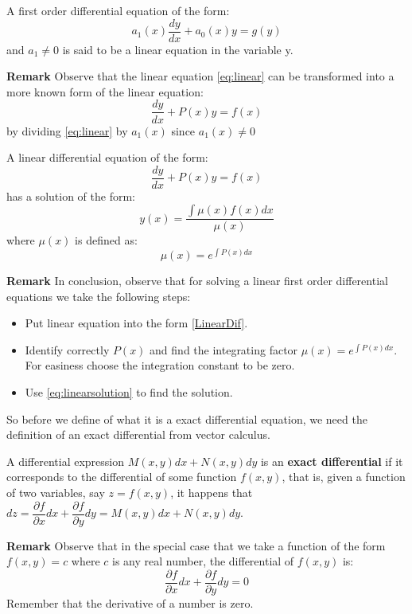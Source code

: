 \begin{define}
A first order differential equation of the form:
\begin{equation} \label{eq:linear}
a_1(x)\dfrac{dy}{dx} + a_0(x)y = g(y)
\end{equation}
and $a_1 \neq 0$ is said to be a linear equation in the variable y.
\end{define}
\textbf{Remark} Observe that the linear equation \eqref{eq:linear}
can be transformed into a more known form of the linear equation:
\begin{equation} \label{LinearDif}
\dfrac{dy}{dx} + P(x)y 	= f(x)
\end{equation}
by dividing \eqref{eq:linear} by $a_1(x)$ since $a_1(x) \neq 0$
\begin{thm}
A linear differential equation of the form:
\begin{equation*}
\dfrac{dy}{dx} + P(x)y 	= f(x)
\end{equation*}
has a solution of the form:
\begin{equation} \label{eq:linearsolution}
y(x) = \dfrac{\int \mu(x)f(x)dx}{ \mu(x)}
\end{equation}
where $\mu(x)$ is defined as:
\begin{equation*}
\mu(x) = e^{ \int P(x) dx}
\end{equation*}
\end{thm}
\textbf{Remark} In conclusion, observe that for solving a linear first order differential equations we take the following steps:
\begin{itemize}
\item Put linear equation into the form \eqref{LinearDif}.
\item Identify correctly $P(x)$ and find the integrating factor $ \mu(x) = e^{ \int P(x) dx}$. For easiness choose the integration constant to be zero.
\item Use \eqref{eq:linearsolution} to find the solution.
\end{itemize} 
So before we define of what it is a exact differential equation, we need the definition of an exact differential from vector calculus.
\begin{define}
A differential expression $ M(x,y)dx + N(x,y)dy $ is an \textbf{exact differential} if it corresponds to the differential of some function $f(x,y)$, that is, given a function of two variables, say $ z = f(x,y) $, it happens that $ dz =  \dfrac{\partial f}{\partial x}dx + \dfrac{\partial f}{\partial y}dy = M(x,y)dx + N(x,y)dy $.
\end{define}
\textbf{Remark}
Observe that in the special case that we take a function of the form $ f(x,y) = c $ where $c$ is any real number, the differential of $f(x,y)$ is:
\begin{equation*}
\dfrac{\partial f}{\partial x} dx + \dfrac{\partial f}{\partial y} dy = 0
\end{equation*}
Remember that the derivative of a number is zero. 

